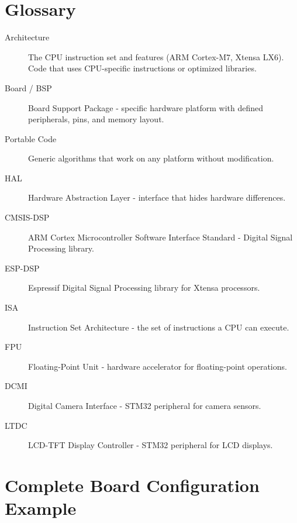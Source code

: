 \documentclass[11pt,a4paper]{article}
\begin{document}
\newpage
\appendix

\section{Glossary}

\begin{description}
    \item[Architecture] The CPU instruction set and features (ARM Cortex-M7, Xtensa LX6). Code that uses CPU-specific instructions or optimized libraries.

    \item[Board / BSP] Board Support Package - specific hardware platform with defined peripherals, pins, and memory layout.

    \item[Portable Code] Generic algorithms that work on any platform without modification.

    \item[HAL] Hardware Abstraction Layer - interface that hides hardware differences.

    \item[CMSIS-DSP] ARM Cortex Microcontroller Software Interface Standard - Digital Signal Processing library.

    \item[ESP-DSP] Espressif Digital Signal Processing library for Xtensa processors.

    \item[ISA] Instruction Set Architecture - the set of instructions a CPU can execute.

    \item[FPU] Floating-Point Unit - hardware accelerator for floating-point operations.

    \item[DCMI] Digital Camera Interface - STM32 peripheral for camera sensors.

    \item[LTDC] LCD-TFT Display Controller - STM32 peripheral for LCD displays.
\end{description}

\section{Complete Board Configuration Example}
\end{document}
